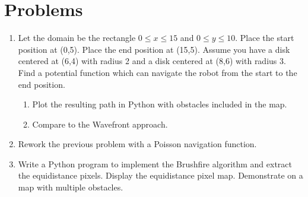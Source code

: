 \hypertarget{problems}{%
\section{Problems}\label{problems}}

\begin{enumerate}
\tightlist
\item
  Let the domain be the rectangle \(0\leq x \leq 15\) and
  \(0 \leq y \leq 10\). Place the start position at (0,5). Place the end
  position at (15,5). Assume you have a disk centered at (6,4) with
  radius 2 and a disk centered at (8,6) with radius 3. Find a potential
  function which can navigate the robot from the start to the end
  position.

  \begin{enumerate}
  \tightlist
  \item
    Plot the resulting path in Python with obstacles included in the
    map.
  \item
    Compare to the Wavefront approach.
  \end{enumerate}
\item
  Rework the previous problem with a Poisson navigation function.
\item
  Write a Python program to implement the Brushfire algorithm and
  extract the equidistance pixels. Display the equidistance pixel map.
  Demonstrate on a map with multiple obstacles.
\end{enumerate}
